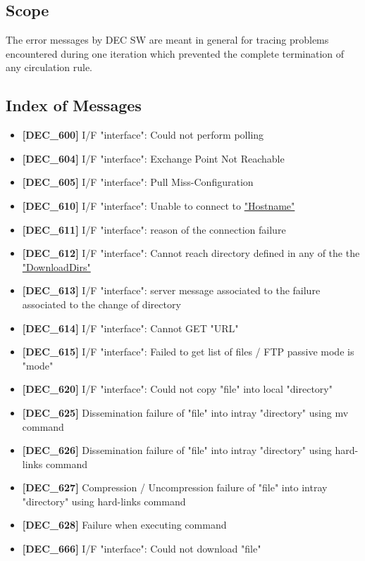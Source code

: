 \documentclass[dec_sum_main.tex]{subfiles}
\begin{document}
\subsection{Scope}
The error messages by DEC SW are meant in general for tracing problems encountered during one iteration which prevented the complete termination of any circulation rule.

\subsection{Index of Messages}

\begin{itemize}
	\item \textbf{[DEC\_600]} I/F "interface": Could not perform polling
	\item \textbf{[DEC\_604]} I/F "interface": Exchange Point Not Reachable
	\item \textbf{[DEC\_605]} I/F "interface": Pull Miss-Configuration
	\item \textbf{[DEC\_610]} I/F "interface": Unable to connect to \hyperref[Config_Server]{"Hostname"}
	\item \textbf{[DEC\_611]} I/F "interface": reason of the connection failure
	\item \textbf{[DEC\_612]} I/F "interface": Cannot reach directory defined in any of the the \hyperref[DownloadDirs]{"DownloadDirs"}
	\item \textbf{[DEC\_613]} I/F "interface": server message associated to the failure associated to the change of directory
	\item \textbf{[DEC\_614]} I/F "interface": Cannot GET "URL"
	\item \textbf{[DEC\_615]} I/F "interface": Failed to get list of files / FTP passive mode is "mode"
	\item \textbf{[DEC\_620]} I/F "interface": Could not copy "file" into local
"directory"
	\item \textbf{[DEC\_625]} Dissemination failure of "file" into intray
"directory" using mv command
	\item \textbf{[DEC\_626]} Dissemination failure of "file" into intray
"directory" using hard-links command
	\item \textbf{[DEC\_627]} Compression / Uncompression failure of "file" into intray
"directory" using hard-links command
	\item \textbf{[DEC\_628]} Failure when executing command
	\item \textbf{[DEC\_666]} I/F "interface": Could not download "file"

\end{itemize}
\end{document}
